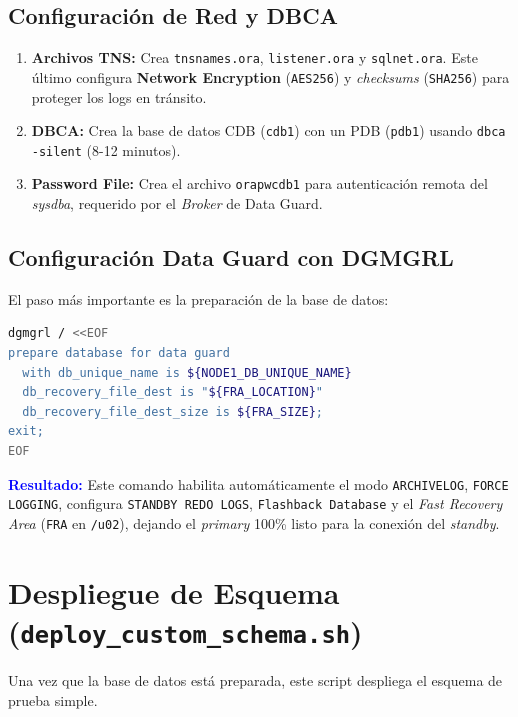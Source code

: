 \documentclass[11pt, a4paper]{report}
\newcommand{\destacado}[1]{\textbf{\textcolor{blue}{#1}}}
\begin{document}
\subsection{Configuración de Red y DBCA}
\begin{enumerate}
    \item \textbf{Archivos TNS:} Crea \texttt{tnsnames.ora}, \texttt{listener.ora} y \texttt{sqlnet.ora}.
Este último configura \textbf{Network Encryption} (\texttt{AES256}) y \textit{checksums} (\texttt{SHA256}) para proteger los logs en tránsito.
\item \textbf{DBCA:} Crea la base de datos CDB (\texttt{cdb1}) con un PDB (\texttt{pdb1}) usando \texttt{dbca -silent} (8-12 minutos).
\item \textbf{Password File:} Crea el archivo \texttt{orapwcdb1} para autenticación remota del \textit{sysdba}, requerido por el \textit{Broker} de Data Guard.
\end{enumerate}

\subsection{Configuración Data Guard con DGMGRL}

El paso más importante es la preparación de la base de datos:
\begin{lstlisting}[language=bash, caption={Comando Moderno PREPARE DATABASE}]
dgmgrl / <<EOF
prepare database for data guard
  with db_unique_name is ${NODE1_DB_UNIQUE_NAME}
  db_recovery_file_dest is "${FRA_LOCATION}"
  db_recovery_file_dest_size is ${FRA_SIZE};
exit;
EOF
\end{lstlisting}
\destacado{Resultado:} Este comando habilita automáticamente el modo \texttt{ARCHIVELOG}, \texttt{FORCE LOGGING}, configura \texttt{STANDBY REDO LOGS}, \texttt{Flashback Database} y el \textit{Fast Recovery Area} (\texttt{FRA} en \texttt{/u02}), dejando el \textit{primary} 100\% listo para la conexión del \textit{standby}.
\section{Despliegue de Esquema (\texttt{deploy\_custom\_schema.sh})}

Una vez que la base de datos está preparada, este script despliega el esquema de prueba simple.
\end{document}
